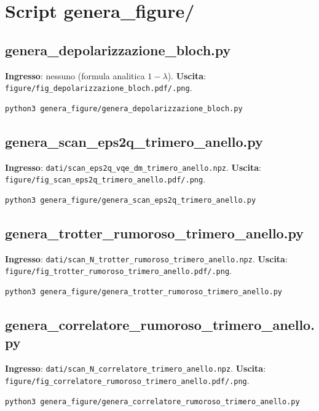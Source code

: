 \documentclass[11pt,a4paper]{article}
\begin{document}
\section{Script genera\_figure/}

\subsection{genera\_depolarizzazione\_bloch.py}
\textbf{Ingresso}: nessuno (formula analitica $1-\lambda$).
\textbf{Uscita}: \texttt{figure/fig\_\allowbreak depolarizzazione\_bloch.pdf/.png}.
\begin{verbatim}
python3 genera_figure/genera_depolarizzazione_bloch.py
\end{verbatim}

\subsection{genera\_scan\_eps2q\_trimero\_anello.py}
\textbf{Ingresso}: \texttt{dati/scan\_eps2q\_\allowbreak vqe\_dm\_trimero\_anello.npz}.
\textbf{Uscita}: \texttt{figure/fig\_scan\_eps2q\_\allowbreak trimero\_anello.pdf/.png}.
\begin{verbatim}
python3 genera_figure/genera_scan_eps2q_trimero_anello.py
\end{verbatim}

\subsection{genera\_trotter\_rumoroso\_trimero\_anello.py}
\textbf{Ingresso}:
\texttt{dati/scan\_N\_trotter\_\allowbreak rumoroso\_trimero\_anello.npz}.
\textbf{Uscita}:
\texttt{figure/fig\_trotter\_\allowbreak rumoroso\_trimero\_anello.pdf/.png}.
\begin{verbatim}
python3 genera_figure/genera_trotter_rumoroso_trimero_anello.py
\end{verbatim}

\subsection{genera\_correlatore\_rumoroso\_trimero\_anello.py}
\textbf{Ingresso}: \texttt{dati/scan\_N\_\allowbreak correlatore\_trimero\_anello.npz}.
\textbf{Uscita}:
\texttt{figure/fig\_correlatore\_\allowbreak rumoroso\_trimero\_anello.pdf/.png}.
\begin{verbatim}
python3 genera_figure/genera_correlatore_rumoroso_trimero_anello.py
\end{verbatim}
\end{document}
